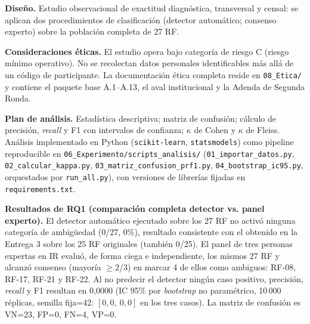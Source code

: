 \documentclass[11pt,a4paper]{article}
\begin{document}
\textbf{Diseño.} Estudio observacional de exactitud diagnóstica, transversal y censal: se aplican dos procedimientos de clasificación (detector automático; consenso experto) sobre la población completa de 27 RF.

\textbf{Consideraciones éticas.} El estudio opera bajo categoría de riesgo C (riesgo mínimo operativo). No se recolectan datos personales identificables más allá de un código de participante. La documentación ética completa reside en \texttt{08\_Etica/} y contiene el paquete base A.1--A.13, el aval institucional y la Adenda de Segunda Ronda.

\textbf{Plan de análisis.} Estadística descriptiva; matriz de confusión; cálculo de precisión, \textit{recall} y F1 con intervalos de confianza; $\kappa$ de Cohen y $\kappa$ de Fleiss. Análisis implementado en Python (\texttt{scikit-learn}, \texttt{statsmodels}) como pipeline reproducible en \texttt{06\_Experimento/scripts\_analisis/} (\texttt{01\_importar\_datos.py}, \texttt{02\_calcular\_kappa.py}, \texttt{03\_matriz\_confusion\_prf1.py}, \texttt{04\_bootstrap\_ic95.py}, orquestados por \texttt{run\_all.py}), con versiones de librerías fijadas en \texttt{requirements.txt}.

\textbf{Resultados de RQ1 (comparación completa detector vs. panel experto).} El detector automático ejecutado sobre los 27 RF no activó ninguna categoría de ambigüedad (0/27, 0\%), resultado consistente con el obtenido en la Entrega 3 sobre los 25 RF originales (también 0/25). El panel de tres personas expertas en IR evaluó, de forma ciega e independiente, los mismos 27 RF y alcanzó consenso (mayoría $\geq$2/3) en marcar 4 de ellos como ambiguos: RF-08, RF-17, RF-21 y RF-22. Al no predecir el detector ningún caso positivo, precisión, \textit{recall} y F1 resultan en 0,0000 (IC 95\% por \textit{bootstrap} no paramétrico, 10\,000 réplicas, semilla fija=42: $[0{,}0,\ 0{,}0]$ en los tres casos). La matriz de confusión es VN=23, FP=0, FN=4, VP=0.
\end{document}
